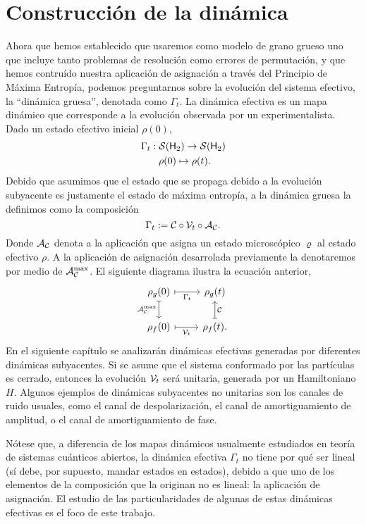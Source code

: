 \section{Construcción de la dinámica}\label{sec:ch2dycon}

Ahora que hemos establecido que usaremos como modelo de grano grueso uno que incluye tanto problemas de resolución como errores de permutación, y que hemos contruído nuestra aplicación de asignación a través del Principio de Máxima Entropía, podemos preguntarnos sobre la evolución del sistema efectivo, la ``dinámica gruesa'', denotada como $\Gamma_t$. La dinámica efectiva es un mapa dinámico que corresponde a la evolución observada por un experimentalista. Dado un estado efectivo inicial $\rho(0)$,
\begin{gather*}
\Gamma_{t}:\mcS(\hilbert_2)\rightarrow \mcS(\hilbert_2)\\
\rho(0) \mapsto \rho(t)\rlap{.}
\end{gather*}
Debido que asumimos que el estado que se propaga debido a la evolución subyacente es justamente el estado de máxima entropía, a la dinámica gruesa la definimos como la composición
\begin{equation*}
\Gamma_t:=\mathcal{C} \circ \mathcal{V}_t \circ \mathcal{A}_{\mathcal{C}}.
\end{equation*}
Donde $\mathcal{A}_{\mathcal{C}}$ denota a la aplicación que asigna un estado microscópico $\varrho$ al estado efectivo $\rho$. A la aplicación de asignación desarrolada previamente la denotaremos por medio de $\mathcal{A}_{\mathcal{C}}^{\max}$. El siguiente diagrama ilustra la ecuación anterior,
\[\begin{tikzcd}[arrows={<-|}]
\rho_{g}(0)  & \rho_{g}(t) \arrow{l}{\Gamma_{t}} \arrow{d}{\mcC}\\
\rho_{f}(0) \arrow{u}{\mcA_{\mcC}^{\max}} & \rho_{f}(t). \arrow{l}{\mcV_{t}}
\end{tikzcd}
\]
En el siguiente capítulo se analizarán dinámicas efectivas generadas por diferentes dinámicas subyacentes. Si se asume que el sistema conformado por las partículas es cerrado, entonces la evolución $\mathcal{V}_{t}$ será unitaria, generada por un Hamiltoniano $H$. Algunos ejemplos de dinámicas subyacentes no unitarias son los canales de ruido usuales, como el canal de despolarización, el canal de amortiguamiento de amplitud, o el canal de amortiguamiento de fase.

Nótese que, a diferencia de los mapas dinámicos usualmente estudiados en teoría de sistemas cuánticos abiertos, la dinámica efectiva $\Gamma_{t}$ no tiene por qué ser lineal (sí debe, por supuesto, mandar estados en estados), debido a que uno de los elementos de la composición que la originan no es lineal: la aplicación de asignación. El estudio de las particularidades de algunas de estas dinámicas efectivas es el foco de este trabajo.

